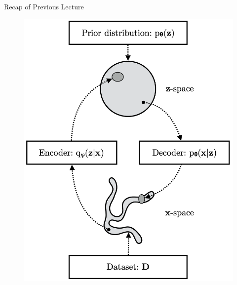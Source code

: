 \documentclass{beamer}
\begin{document}
\begin{frame}{Recap of Previous Lecture}
\begin{minipage}[t]{0.4\columnwidth}
\begin{figure}[h]
			\includegraphics[width=\linewidth]{figs/vae_scheme}
		\end{figure}
	\end{minipage}
\end{frame}
\end{document}
